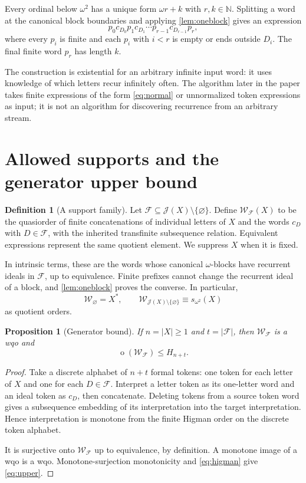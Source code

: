 \documentclass[11pt]{article}
\numberwithin{equation}{section}
\theoremstyle{plain}
\newtheorem{proposition}[proposition]{Proposition}
\theoremstyle{definition}
\newtheorem{definition}[definition]{Definition}
\theoremstyle{remark}
\newcommand{\ot}{\operatorname{o}}
\newcommand{\J}{\mathcal J}
\newcommand{\F}{\mathcal F}
\newcommand{\W}{\mathcal W}
\newcommand{\HH}{H}
\newcommand{\N}{\mathbb N}
\begin{document}
Every ordinal below $\omega^2$ has a unique form $\omega r+k$ with $r,k\in\N$. Splitting a word at the canonical block boundaries and applying \cref{lem:oneblock} gives an expression
\begin{equation}\label{eq:normal}
 p_0c_{D_0}p_1c_{D_1}\cdots p_{r-1}c_{D_{r-1}}p_r,
\end{equation}
where every $p_i$ is finite and each $p_i$ with $i<r$ is empty or ends outside $D_i$. The final finite word $p_r$ has length $k$.

The construction is existential for an arbitrary infinite input word: it uses knowledge of which letters recur infinitely often. The algorithm later in the paper takes finite expressions of the form \eqref{eq:normal} or unnormalized token expressions as input; it is not an algorithm for discovering recurrence from an arbitrary stream.

\section{Allowed supports and the generator upper bound}\label{sec:upper}

\begin{definition}[A support family]
Let $\F\subseteq\J(X)\setminus\{\varnothing\}$. Define $\W_{\F}(X)$ to be the quasiorder of finite concatenations of individual letters of $X$ and the words $c_D$ with $D\in\F$, with the inherited transfinite subsequence relation. Equivalent expressions represent the same quotient element. We suppress $X$ when it is fixed.
\end{definition}

In intrinsic terms, these are the words whose canonical $\omega$-blocks have recurrent ideals in $\F$, up to equivalence. Finite prefixes cannot change the recurrent ideal of a block, and \cref{lem:oneblock} proves the converse. In particular,
\begin{equation}\label{eq:allfamily}
 \W_{\varnothing}=X^*,
 \qquad
 \W_{\J(X)\setminus\{\varnothing\}}\equiv s_{\omega^2}(X)
\end{equation}
as quotient orders.

\begin{proposition}[Generator bound]\label{prop:upper}
If $n=|X|\geq1$ and $t=|\F|$, then $\W_{\F}$ is a wqo and
\begin{equation}\label{eq:upper}
 \ot(\W_{\F})\leq\HH_{n+t}.
\end{equation}
\end{proposition}
\begin{proof}
Take a discrete alphabet of $n+t$ formal tokens: one token for each letter of $X$ and one for each $D\in\F$. Interpret a letter token as its one-letter word and an ideal token as $c_D$, then concatenate. Deleting tokens from a source token word gives a subsequence embedding of its interpretation into the target interpretation. Hence interpretation is monotone from the finite Higman order on the discrete token alphabet.

It is surjective onto $\W_{\F}$ up to equivalence, by definition. A monotone image of a wqo is a wqo. Monotone-surjection monotonicity and \eqref{eq:higman} give \eqref{eq:upper}.
\end{proof}
\end{document}
